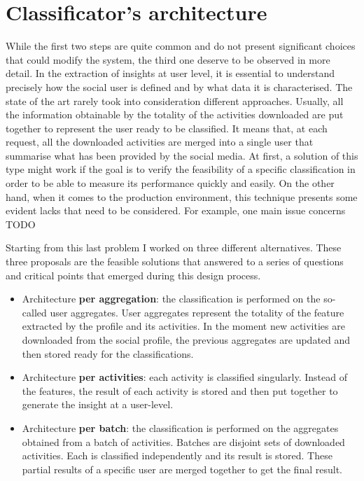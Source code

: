 \section{Classificator's architecture}
While the first two steps are quite common and do not present significant choices that could modify the system, the third one deserve to be observed in more detail.
In the extraction of insights at user level, it is essential to understand precisely how the social user is defined and by what data it is characterised.
The state of the art rarely took into consideration different approaches. Usually, all the information obtainable by the totality of the activities downloaded are put together to represent the user ready to be classified.
It means that, at each request, all the downloaded activities are merged into a single user that summarise what has been provided by the social media.
At first, a solution of this type might work if the goal is to verify the feasibility of a specific classification in order to be able to measure its performance quickly and easily.
On the other hand, when it comes to the production environment, this technique presents some evident lacks that need to be considered.
For example, one main issue concerns TODO %

Starting from this last problem I worked on three different alternatives. These three proposals are the feasible solutions that answered to a series of questions and critical points that emerged during this design process. 
\begin{itemize}
    \item Architecture \textbf{per aggregation}: the classification is performed on the so-called user aggregates. User aggregates represent the totality of the feature extracted by the profile and its activities. In the moment new activities are downloaded from the social profile, the previous aggregates are updated and then stored ready for the classifications.
    \item Architecture \textbf{per activities}: each activity is classified singularly. Instead of the features, the result of each activity is stored and then put together to generate the insight at a user-level.
    \item Architecture \textbf{per batch}: the classification is performed on the aggregates obtained from a batch of activities. Batches are disjoint sets of downloaded activities. Each is classified independently and its result is stored. These partial results of a specific user are merged together to get the final result. 
\end{itemize}

